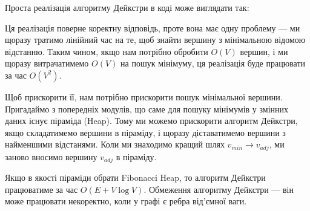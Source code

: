 \documentclass[12pt,a4paper]{report}
\begin{document}
Проста реалізація алгоритму Дейкстри в коді може виглядати так:



Ця реалізація поверне коректну відповідь, проте вона має одну проблему --- ми щоразу тратимо лінійний час на те, щоб знайти вершину з мінімальною відомою відстанню.
Таким чином, якщо нам потрібно обробити \(O(V)\) вершин, і ми щоразу витрачатимемо \(O(V)\) на пошук мінімуму, ця реалізація буде працювати за час \(O(V^2)\).

Щоб прискорити її, нам потрібно прискорити пошук мінімальної вершини. Пригадаймо з попередніх модулів, що саме для пошуку мінімумів у змінних даних існує піраміда (Heap). Тому ми можемо прискорити алгоритм Дейкстри, якщо складатимемо вершини в піраміду, і щоразу діставатимемо вершини з найменшими відстанями. Коли ми знаходимо кращий шлях \(v_{min} \rightarrow v_{adj}\), ми заново вносимо вершину \(v_{adj}\) в піраміду.



Якщо в якості піраміди обрати Fibonacci Heap, то алгоритм Дейкстри працюватиме за час \(O(E + V \log V)\). Обмеження алгоритму Дейкстри --- він може працювати некоректно, коли у графі є ребра від’ємної ваги.
\end{document}
